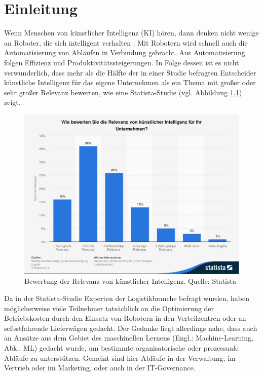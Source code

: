 \chapter{Einleitung}
\label{einleitung}



Wenn Menschen von künstlicher Intelligenz (KI) hören, dann denken nicht wenige an Roboter, die sich intelligent verhalten \cite[S. 1]{Geron}. Mit Robotern wird schnell auch die Automatisierung von Abläufen in Verbindung gebracht. Aus Automatisierung folgen Effizienz und Produktivitätssteigerungen. In Folge dessen ist es nicht verwunderlich, dass mehr als die Hälfte der in einer Studie befragten Entscheider künstliche Intelligenz für das eigene Unternehmen als ein Thema mit großer oder sehr großer Relevanz bewerten, wie eine Statista-Studie (vgl. Abbildung \ref{Abbildung:statista}) zeigt. 

\begin{figure}[h]
\centering
\includegraphics[scale=0.95]{content/pics/Picture_1.png}
\caption{Bewertung der Relevanz von künstlicher Intelligenz. Quelle: Statista \cite{Statista}}
\label{Abbildung:statista}
\end{figure}

Da in der Statista-Studie Experten der Logistikbranche befragt wurden, haben möglicherweise viele Teilnehmer tatsächlich an die Optimierung der Betriebskosten durch den Einsatz von Robotern in den Verteilzentren oder an selbstfahrende Lieferwägen gedacht. Der Gedanke liegt allerdings nahe, dass auch an Ansätze aus dem Gebiet des maschinellen Lernens (Engl.: Machine-Learning, Abk.: ML) gedacht wurde, um bestimmte organisatorische oder prozessuale Abläufe zu unterstützen. Gemeint sind hier Abläufe in der Verwaltung, im Vertrieb oder im Marketing, oder auch in der IT-Governance.

